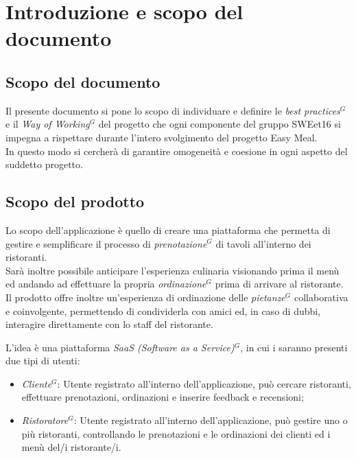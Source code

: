 \section{Introduzione e scopo del documento}

    \subsection{Scopo del documento}

    Il presente documento si pone lo scopo di individuare e definire le \emph{best practices}$^{G}$ e il \emph{Way of Working}$^{G}$ del progetto che ogni componente del gruppo SWEet16
    si impegna a rispettare durante l’intero svolgimento del progetto Easy Meal. \\
    In questo modo si cercherà di garantire omogeneità e coesione in ogni aspetto del suddetto progetto.

    \subsection{Scopo del prodotto}

    Lo scopo dell’applicazione è quello di creare una piattaforma che permetta di gestire e semplificare il processo di \emph{prenotazione}$^{G}$ di tavoli all’interno dei ristoranti. \\
    Sarà inoltre possibile anticipare l’esperienza culinaria visionando prima il menù ed andando ad effettuare la propria \emph{ordinazione}$^{G}$ prima di arrivare al ristorante. \\
    Il prodotto offre inoltre un’esperienza di ordinazione delle \emph{pietanze}$^{G}$ collaborativa e coinvolgente, permettendo di condividerla con amici ed, in caso di dubbi, interagire direttamente con lo staff del ristorante.

    L’idea è una piattaforma \emph{SaaS (Software as a Service)}$^{G}$, in cui i saranno presenti due tipi di utenti:
    \begin{itemize}
      \item \emph{Cliente}$^{G}$: Utente registrato all’interno dell’applicazione, può cercare ristoranti, effettuare prenotazioni, ordinazioni e inserire feedback e recensioni;
      \item \emph{Ristoratore}$^{G}$: Utente registrato all’interno dell’applicazione, può gestire uno o più ristoranti, controllando le prenotazioni e le ordinazioni dei clienti ed i menù del/i ristorante/i.
    \end{itemize}


